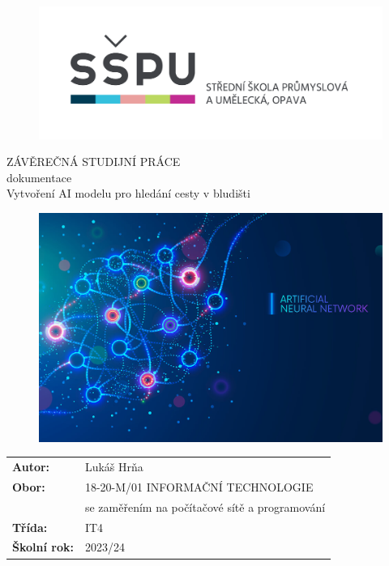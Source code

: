 \documentclass[12pt, a4paper,
twoside,        %
openright
]{report}
\title{\nazevPrace} %
\author{\jmenoAutora} %
\date{\datumOdevzdani} %
\newcommand\obor{INFORMAČNÍ TECHNOLOGIE} %
\newcommand\kodOboru{18-20-M/01} %
\newcommand\zamereni{se zaměřením na počítačové sítě a programování} %
\newcommand\trida{IT4} %
\newcommand\jmenoAutora{Lukáš Hrňa}  %
\newcommand\skolniRok{2023/24} %
\newcommand\nazevPrace{Vytvoření AI modelu pro hledání cesty v bludišti} %
\begin{document}
	
	\pagestyle{empty}
	
	\cleardoublepage

	
	{\selectfont
		\begin{figure}[h]
			\centering
			\includegraphics[width=0.6\linewidth]{image/logo-skoly.png} 
		\end{figure}
		
		
		{\bfseries %
			\begin{center}
				\vspace{0.025 \textheight}
				\LARGE{ZÁVĚREČNÁ STUDIJNÍ PRÁCE}\\
				\large{dokumentace}\\
				\vspace{0.075 \textheight}
				\LARGE {\nazevPrace}\\
			\end{center}  
		}%
		
		\begin{figure}[h]
			\centering
			\includegraphics[width=0.7\linewidth]{image/programovani-02.jpeg} 
		\end{figure}
		
		\vspace{0.02 \textheight}
		\begin{table}[h!]
			\begin{tabular}{ll}
				\textbf{Autor:} & \jmenoAutora\\ 
				\textbf{Obor:} & \kodOboru { } \obor\\
				\textbf{} & \zamereni\\
				\textbf{Třída:} & \trida\\
				\textbf{Školní rok:} & \skolniRok\\
			\end{tabular}
			
		\end{table}		
	}
	
\end{document}
